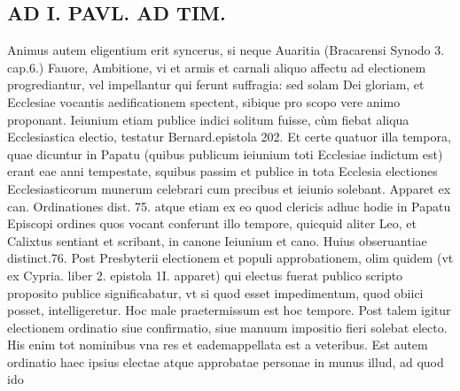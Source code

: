 \documentclass{article}
\begin{document}
\begin{pages}
\section*{AD I. PAVL. AD TIM. }
\marginpar{[ p.339 ]}\pstart Animus autem eligentium erit syncerus, si neque Auaritia (Bracarensi Synodo 3. cap.6.) Fauore, Ambitione, vi et armis et carnali aliquo affectu ad electionem progrediantur, vel impellantur qui ferunt suffragia: sed solam Dei gloriam, et Ecclesiae vocantis aedificationem spectent, sibique  pro scopo vere animo proponant.  \pend\pstart Ieiunium etiam publice indici solitum fuisse, cùm fiebat aliqua Ecclesiastica electio, testatur Bernard.epistola 202. Et certe quatuor illa tempora, quae dicuntur in Papatu (quibus publicum ieiunium toti Ecclesiae indictum est) erant eae anni tempestate, squibus passim et publice in tota Ecclesia electiones Ecclesiasticorum munerum celebrari cum precibus et ieiunio solebant. Apparet ex can. Ordinationes dist. 75. atque  etiam ex eo quod clericis adhuc hodie in Papatu Episcopi ordines quos vocant conferunt illo tempore, quicquid aliter Leo, et Calixtus sentiant et scribant, in canone Ieiunium et cano. Huius obseruantiae distinct.76.  \pend\pstart Post Presbyterii electionem et populi approbationem, olim quidem (vt ex Cypria. liber 2. epistola 1I. apparet) qui electus fuerat publico scripto proposito publice significabatur, vt si quod esset impedimentum, quod obiici posset, intelligeretur. Hoc male praetermissum est hoc tempore. Post talem igitur electionem ordinatio siue confirmatio, siue manuum impositio fieri solebat electo. His enim tot nominibus vna res et eademappellata est a veteribus.  \pend\pstart Est autem ordinatio haec ipsius electae atque approbatae personae in munus illud, ad quod ido\pend

\end{pages}
\end{document}
